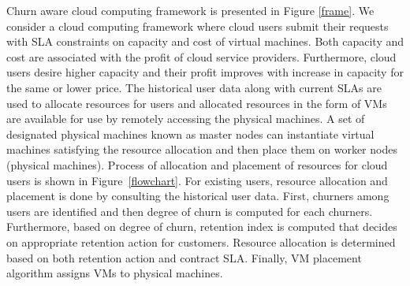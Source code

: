 Churn aware cloud computing framework is presented in Figure \ref{frame}. We consider a cloud computing framework where cloud users submit their requests with SLA constraints on capacity and cost of virtual machines. Both capacity and cost are associated with the profit of cloud service providers. Furthermore, cloud users desire higher capacity and their profit improves with increase in capacity for the same or lower price.  The historical user data along with current SLAs are used to allocate resources for users and allocated resources in the form of VMs are available for use by remotely accessing the physical machines. A set of designated physical machines known as master nodes can instantiate virtual machines satisfying the resource allocation and then place them on worker nodes (physical machines). Process of allocation and placement of resources for cloud users is shown in Figure~\ref{flowchart}. For existing users, resource allocation and placement is done by consulting the historical user data. First, churners among users are identified and then degree of churn is computed for each churners. Furthermore, based on degree of churn, retention index is computed that decides on appropriate retention action for customers. Resource allocation is determined based on both retention action and contract SLA. Finally, VM placement algorithm assigns VMs to physical machines.





